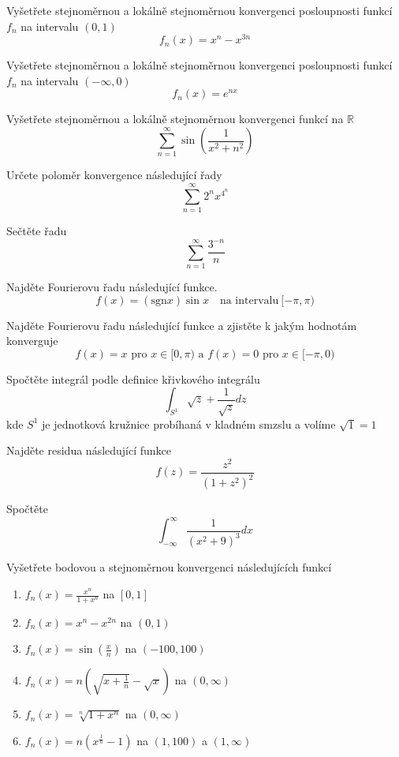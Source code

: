 \begin{multicols}{2}

Vyšetřete stejnoměrnou a lokálně stejnoměrnou konvergenci posloupnosti funkcí $f_n$ na intervalu $(0,1)$
$$f_n(x) = x^n - x^{3n}$$

\separator

Vyšetřete stejnoměrnou a lokálně stejnoměrnou konvergenci posloupnosti funkcí $f_n$ na intervalu $(-\infty,0)$
$$f_n(x) = e^{nx}$$

\separator

Vyšetřete stejnoměrnou a lokálně stejnoměrnou konvergenci funkcí na $\mathbb{R}$
$$\sum_{n=1}^\infty \sin \left( \frac{1}{x^2 + n^2} \right)$$

\separator

Určete poloměr konvergence následující řady
$$\sum_{n=1}^\infty 2^n x^{4^n}$$

\separator

Sečtěte řadu
$$\sum_{n=1}^{\infty} \frac{3^{-n}}{n}$$

\separator 

Najděte Fourierovu řadu následující funkce.
$$f(x) = (\textrm{sgn} x) \sin x \quad \textrm{na intervalu} \ [-\pi, \pi)$$

\separator

Najděte Fourierovu řadu následující funkce a zjistěte k jakým hodnotám konverguje
$$f(x)=x \textrm{ pro } x \in [0,\pi) \textrm{ a } f(x)=0 \textrm{ pro } x \in [-\pi,0)$$

\separator

Spočtěte integrál podle definice křivkového integrálu
$$\int_{S^1} \sqrt{z} + \frac{1}{\sqrt{z}} dz$$
kde $S^1$ je jednotková kružnice probíhaná v kladném smzslu a volíme $\sqrt{1}=1$

\separator

Najděte residua následující funkce
$$f(z)=\frac{z^2}{(1+z^2)^2}$$

\separator

Spočtěte
$$\int_{-\infty}^\infty \frac{1}{(x^2 + 9)^3} dx$$

\separator

Vyšetřete bodovou a stejnoměrnou konvergenci následujících funkcí
\begin{enumerate}
\item $f_n(x) = \frac{x^n}{1+x^n}$ na $[0,1]$
\item $f_n(x) = x^n - x^{2n}$ na $(0,1)$
\item $f_n(x) = \sin \left( \frac{x}{n} \right)$ na $(-100,100)$
\item $f_n(x) = n \left( \sqrt{x + \frac{1}{n}} - \sqrt{x} \right)$ na $(0,\infty)$
\item $f_n(x) = \sqrt[n]{1+x^n}$ na $(0,\infty)$
\item $f_n(x) = n \left( x^\frac{1}{n} - 1 \right)$ na $(1,100)$ a $(1,\infty)$
\end{enumerate}


\end{multicols}

